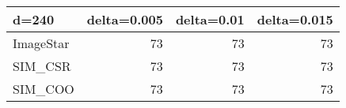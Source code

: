 \begin{tabular}{lrrr}
\hline
 d=240     &   delta=0.005 &   delta=0.01 &   delta=0.015 \\
\hline
 ImageStar &            73 &           73 &            73 \\
 SIM\_CSR   &            73 &           73 &            73 \\
 SIM\_COO   &            73 &           73 &            73 \\
\hline
\end{tabular}
